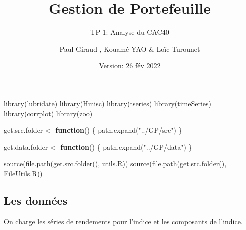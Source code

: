 \documentclass[
]{article}
\title{Gestion de Portefeuille}
\subtitle{TP-1: Analyse du CAC40}
\author{Paul Giraud , Kouamé YAO \& Loïc Turounet}
\date{Version: 26 fév 2022}
\newenvironment{Shaded}{\begin{snugshade}}{\end{snugshade}}
\newcommand{\ControlFlowTok}[1]{\textcolor[rgb]{0.13,0.29,0.53}{\textbf{#1}}}
\newcommand{\FunctionTok}[1]{\textcolor[rgb]{0.00,0.00,0.00}{#1}}
\newcommand{\NormalTok}[1]{#1}
\newcommand{\OtherTok}[1]{\textcolor[rgb]{0.56,0.35,0.01}{#1}}
\newcommand{\StringTok}[1]{\textcolor[rgb]{0.31,0.60,0.02}{#1}}
\begin{document}
\maketitle

\begin{Shaded}
\begin{Highlighting}[]
\FunctionTok{library}\NormalTok{(lubridate)}
\FunctionTok{library}\NormalTok{(Hmisc)}
\FunctionTok{library}\NormalTok{(tseries)}
\FunctionTok{library}\NormalTok{(timeSeries)}
\FunctionTok{library}\NormalTok{(corrplot)}
\FunctionTok{library}\NormalTok{(zoo)}

\NormalTok{get.src.folder }\OtherTok{\textless{}{-}} \ControlFlowTok{function}\NormalTok{() \{}
  \FunctionTok{path.expand}\NormalTok{(}\StringTok{"../GP/src"}\NormalTok{)}
\NormalTok{\}}

\NormalTok{get.data.folder }\OtherTok{\textless{}{-}} \ControlFlowTok{function}\NormalTok{() \{}
  \FunctionTok{path.expand}\NormalTok{(}\StringTok{"../GP/data"}\NormalTok{)}
\NormalTok{\}}

\FunctionTok{source}\NormalTok{(}\FunctionTok{file.path}\NormalTok{(}\FunctionTok{get.src.folder}\NormalTok{(), }\StringTok{\textquotesingle{}utils.R\textquotesingle{}}\NormalTok{))}
\FunctionTok{source}\NormalTok{(}\FunctionTok{file.path}\NormalTok{(}\FunctionTok{get.src.folder}\NormalTok{(), }\StringTok{\textquotesingle{}FileUtils.R\textquotesingle{}}\NormalTok{))}
\end{Highlighting}
\end{Shaded}

\hypertarget{les-donnuxe9es}{%
\subsection{Les données}\label{les-donnuxe9es}}

On charge les séries de rendements pour l'indice et les composants de
l'indice.
\end{document}
